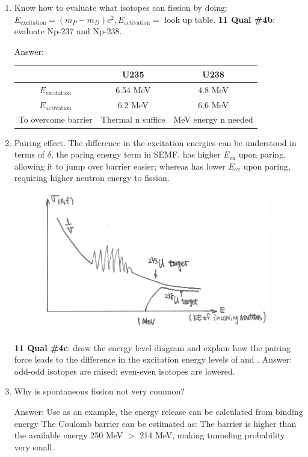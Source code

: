\documentclass{school-22.101-notes}
\begin{document}
\begin{enumerate}
\begin{enumerate}
\item Know how to evaluate what isotopes can fission by doing: $E_{\mathrm{excitation}} = (m_P - m_D)c^2, E_{\mathrm{activation}} = $ look up table. \textbf{11 Qual \#4b}: evaluate Np-237 and Np-238. 

Answer: 
\begin{table}[ht]
    \centering
    \begin{tabular}{|c|c|c|} \hline
    & U235 & U238  \\ \hline
    $E_{\mathrm{excitation}}$ & 6.54 MeV & 4.8 MeV \\ \hline
    $E_{\mathrm{activation}}$ & 6.2  MeV & 6.6 MeV \\ \hline
    To overcome barrier & Thermal n suffice & MeV energy n needed \\ \hline
    \end{tabular}
\end{table}

\item Pairing effect. The difference in the excitation energies can be understood in terms of $\delta$, the paring energy term in SEMF.  has higher $E_{\mathrm{ex}}$ upon paring, allowing it to jump over barrier easier; whereas  has lower $E_{\mathrm{ex}}$ upon paring, requiring higher neutron energy to fission. 
\begin{figure}[ht]
   \centering
   \includegraphics[width=4in]{images/ni/KE-incoming-neutron.png}
\end{figure}
\textbf{11 Qual \#4c}: draw the energy level diagram and explain how the pairing force leads to the difference in the excitation energy levels of  and . Answer: odd-odd isotopes are raised; even-even isotopes are lowered. 


\item Why is spontaneous fission not very common? 

Answer: Use   as an example, the energy release can be calculated from binding energy
The Coulomb barrier can be estimated as:
The barrier is higher than the available energy 250 MeV $>$ 214 MeV, making tunneling probability very small. 


\end{enumerate}
\end{enumerate}
\end{document}
